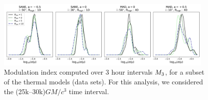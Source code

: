\begin{figure}
  \centering
  \includegraphics[width=0.95\textwidth]{figures/mi_rlow_select_models.png}
  \caption{Modulation index computed over 3 hour intervals $M_{3}$, for a subset of the thermal models (\kharma data sets). For this analysis, we considered the (25k--30k)$GM/c^{3}$ time interval.}
  \label{fig:mi_rlow}
\end{figure}



